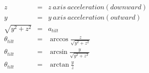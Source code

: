 \documentclass[12pt]{article}
\begin{document}
\begin{eqnarray}
\nonumber
z &=& z\ axis\ acceleration(downward)\\
\nonumber
y &=& y\ axis\ acceleration (outward)\\
\nonumber
\sqrt{y^2+z^2} &=& a_{tilt}\\
\nonumber
\theta_{tilt} &=& \arccos{\frac{z}{\sqrt{y^2+z^2}}}\\
\nonumber
\theta_{tilt} &=& \arcsin{\frac{y}{\sqrt{y^2+z^2}}}\\
\nonumber
\theta_{tilt} &=& \arctan{\frac{y}{z}}
\end{eqnarray}
\end{document}
